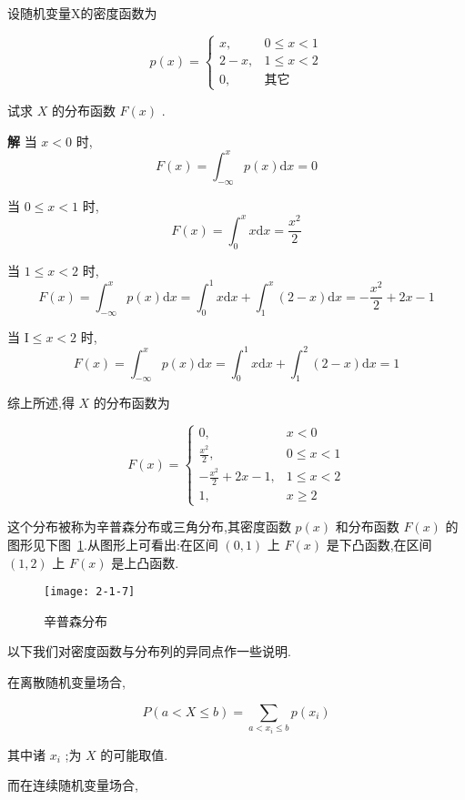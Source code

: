\begin{example}
	设随机变量X的密度函数为
	
	\[ 
	p(x)=\left\{\begin{array}{ll}{x,} & {0 \leqslant x<1} \\ {2-x,} & {1 \leqslant x<2} \\ {0,} & {\text{其它}}\end{array}\right.
	\]
	
	试求 $ X $ 的分布函数 $ F(x) $ .
	
	\textbf{解} 当 $ x<0 $ 时,
	\[ 
	F(x)=\int_{-\infty}^{x} p(x) \mathrm{d} x=0
	\]
	
	当 $ 0 \leqslant x<1 $ 时,
	\[ 
	F(x)=\int_{0}^{x} x \mathrm{d} x=\frac{x^{2}}{2}
	\]
	
	当 $ 1 \leqslant x<2 $ 时,
	\[ 
	F(x)=\int_{-\infty}^{x} p(x) \mathrm{d} x=\int_{0}^{1} x \mathrm{d} x+\int_{1}^{x}(2-x) \mathrm{d} x=-\frac{x^{2}}{2}+2 x-1
	\]
	
	当 $ \mathrm{I} \leqslant x<2 $ 时,
	\[ 
	F(x)=\int_{-\infty}^{x} p(x) \mathrm{d} x=\int_{0}^{1} x \mathrm{d} x+\int_{1}^{2}(2-x) \mathrm{d} x=1
	\]
	
	综上所述,得 $ X $ 的分布函数为
	
	\[ 
	F(x)=\left\{\begin{array}{ll}
	{0,} & {x<0} \\ 
	{\frac{x^{2}}{2},} & {0 \leqslant x<1} \\ 
	{-\frac{x^{2}}{2}+2 x-1,} & {1 \leqslant x<2} \\ 
	{1,} & {x \geqslant 2}
	\end{array}\right.
	\]
\end{example}

这个分布被称为辛普森分布或三角分布,其密度函数 $ p(x) $ 和分布函数 $ F(x) $ 的图形见下图~\ref{fig:2-1-7}.从图形上可看出:在区间 $ (0,1) $ 上 $ F(x) $ 是下凸函数,在区间 $ (1,2) $ 上 $ F(x) $ 是上凸函数.

\begin{figure}
	\centering
	\texttt{[image: 2-1-7]}
	\caption{辛普森分布}
	\label{fig:2-1-7}
\end{figure}

以下我们对密度函数与分布列的异同点作一些说明.

在离散随机变量场合,

\[ 
P(a<X \leqslant b)=\sum_{a<x_{i} \leqslant b} p\left(x_{i}\right)
\]

其中诸 $ x_i $ ;为 $ X $ 的可能取值.

而在连续随机变量场合,

